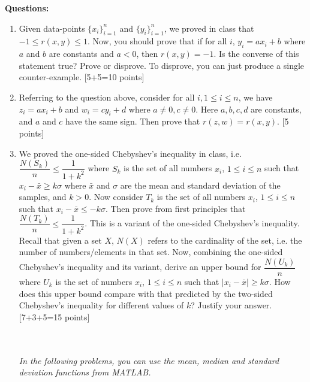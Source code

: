 \documentclass[11pt]{article}
\begin{document}
\textbf{Questions:}
\begin{enumerate}
\item Given data-points $\{x_i\}_{i=1}^n$ and $\{y_i\}_{i=1}^n$, we proved in class that $-1 \leq r(x,y) \leq 1$. Now, you should prove that if for all $i$, $y_i = a x_i + b$ where $ a$ and $b$ are constants and $a < 0$, then $r(x,y) = -1$. Is the converse of this statement true? Prove or disprove. To disprove, you can just produce a single counter-example. \textsf{[5+5=10 points]}

\item Referring to the question above, consider for all $i, 1 \leq i \leq n$, we have $z_i = a x_i + b$ and $w_ i = c y_i + d$ where $a \neq 0, c \neq 0$. Here $a,b,c,d$ are constants, and $a$ and $c$ have the same sign. Then prove that $r(z,w) = r(x,y)$. \textsf{[5 points]}

\item We proved the one-sided Chebyshev's inequality in class, i.e. $\dfrac{N(S_k)}{n} \leq \dfrac{1}{1+k^2}$ where $S_k$ is the set of all numbers $x_i$, $1 \leq i \leq n$ such that $x_i - \bar{x} \geq k \sigma$ where $\bar{x}$ and $\sigma$ are the mean and standard deviation of the samples, and $k > 0$. Now consider $T_k$ is the set of all numbers $x_i$, $1 \leq i \leq n$ such that $x_i - \bar{x} \leq -k \sigma$. Then prove from first principles that $\dfrac{N(T_k)}{n} \leq \dfrac{1}{1+k^2}$. This is a variant of the one-sided Chebyshev's inequality. Recall that given a set $X$, $N(X)$ refers to the cardinality of the set, i.e. the number of numbers/elements in that set. Now, combining the one-sided Chebyshev's inequality and its variant, derive an upper bound for $\dfrac{N(U_k)}{n}$ where $U_k$ is the set of numbers $x_i$, $1 \leq i \leq n$ such that $|x_i - \bar{x}| \geq k \sigma$. How does this upper bound compare with that predicted by the two-sided Chebyshev's inequality for different values of $k$? Justify your answer. \textsf{[7+3+5=15 points]}  

\newpage
\\
\\
\textit{In the following problems, you can use the mean, median and standard deviation functions from MATLAB.}



\end{enumerate}
\end{document}
